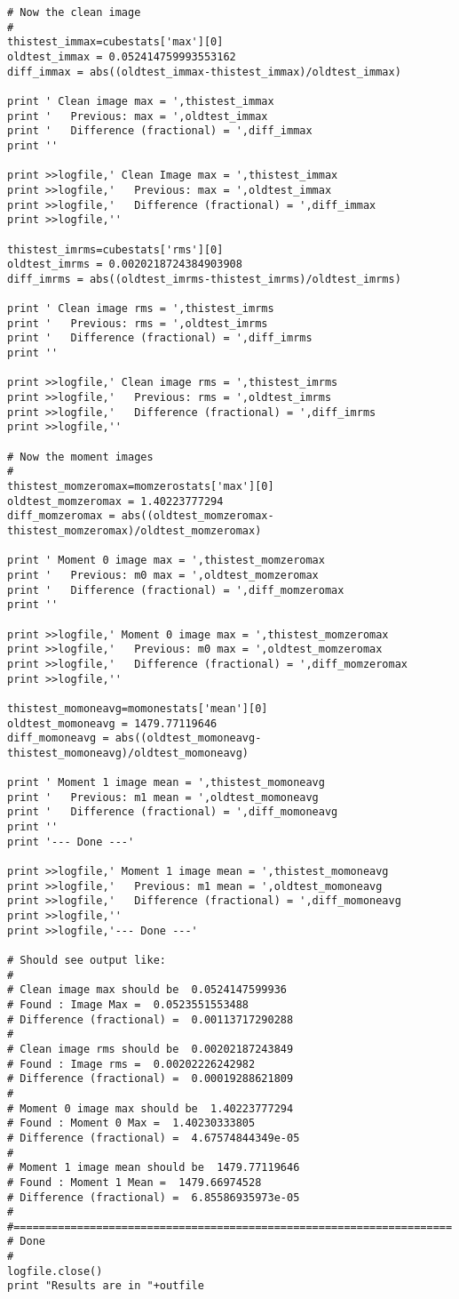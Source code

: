 \begin{verbatim}
# Now the clean image
#
thistest_immax=cubestats['max'][0]
oldtest_immax = 0.052414759993553162
diff_immax = abs((oldtest_immax-thistest_immax)/oldtest_immax)

print ' Clean image max = ',thistest_immax
print '   Previous: max = ',oldtest_immax
print '   Difference (fractional) = ',diff_immax
print ''

print >>logfile,' Clean Image max = ',thistest_immax
print >>logfile,'   Previous: max = ',oldtest_immax
print >>logfile,'   Difference (fractional) = ',diff_immax
print >>logfile,''

thistest_imrms=cubestats['rms'][0]
oldtest_imrms = 0.0020218724384903908
diff_imrms = abs((oldtest_imrms-thistest_imrms)/oldtest_imrms)

print ' Clean image rms = ',thistest_imrms
print '   Previous: rms = ',oldtest_imrms
print '   Difference (fractional) = ',diff_imrms
print ''

print >>logfile,' Clean image rms = ',thistest_imrms
print >>logfile,'   Previous: rms = ',oldtest_imrms
print >>logfile,'   Difference (fractional) = ',diff_imrms
print >>logfile,''

# Now the moment images
#
thistest_momzeromax=momzerostats['max'][0]
oldtest_momzeromax = 1.40223777294
diff_momzeromax = abs((oldtest_momzeromax-thistest_momzeromax)/oldtest_momzeromax)

print ' Moment 0 image max = ',thistest_momzeromax
print '   Previous: m0 max = ',oldtest_momzeromax
print '   Difference (fractional) = ',diff_momzeromax
print ''

print >>logfile,' Moment 0 image max = ',thistest_momzeromax
print >>logfile,'   Previous: m0 max = ',oldtest_momzeromax
print >>logfile,'   Difference (fractional) = ',diff_momzeromax
print >>logfile,''

thistest_momoneavg=momonestats['mean'][0]
oldtest_momoneavg = 1479.77119646
diff_momoneavg = abs((oldtest_momoneavg-thistest_momoneavg)/oldtest_momoneavg)

print ' Moment 1 image mean = ',thistest_momoneavg
print '   Previous: m1 mean = ',oldtest_momoneavg
print '   Difference (fractional) = ',diff_momoneavg
print ''
print '--- Done ---'

print >>logfile,' Moment 1 image mean = ',thistest_momoneavg
print >>logfile,'   Previous: m1 mean = ',oldtest_momoneavg
print >>logfile,'   Difference (fractional) = ',diff_momoneavg
print >>logfile,''
print >>logfile,'--- Done ---'

# Should see output like:
#
# Clean image max should be  0.0524147599936
# Found : Image Max =  0.0523551553488
# Difference (fractional) =  0.00113717290288
#
# Clean image rms should be  0.00202187243849
# Found : Image rms =  0.00202226242982
# Difference (fractional) =  0.00019288621809
#
# Moment 0 image max should be  1.40223777294
# Found : Moment 0 Max =  1.40230333805
# Difference (fractional) =  4.67574844349e-05
#
# Moment 1 image mean should be  1479.77119646
# Found : Moment 1 Mean =  1479.66974528
# Difference (fractional) =  6.85586935973e-05
#
#=====================================================================
# Done
#
logfile.close()
print "Results are in "+outfile

\end{verbatim}
